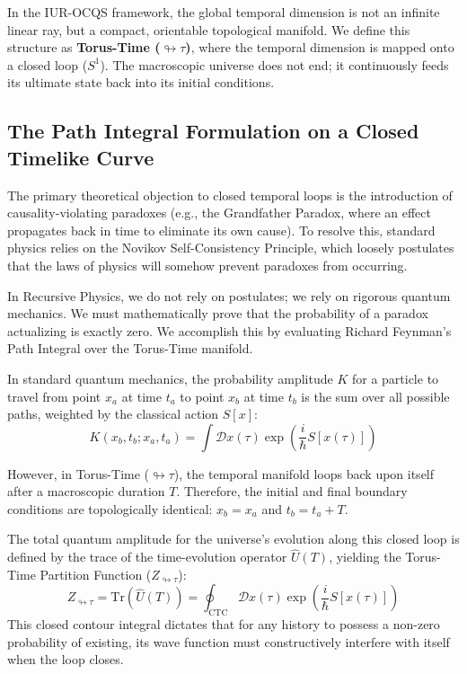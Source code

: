 \documentclass[12pt,openany]{book}
\begin{document}
In the IUR-OCQS framework, the global temporal dimension is not an infinite linear ray, but a compact, orientable topological manifold. We define this structure as \textbf{Torus-Time ($\looparrowright\tau$)}, where the temporal dimension is mapped onto a closed loop ($S^1$). The macroscopic universe does not end; it continuously feeds its ultimate state back into its initial conditions.

\subsection{The Path Integral Formulation on a Closed Timelike Curve}
The primary theoretical objection to closed temporal loops is the introduction of causality-violating paradoxes (e.g., the Grandfather Paradox, where an effect propagates back in time to eliminate its own cause). To resolve this, standard physics relies on the Novikov Self-Consistency Principle, which loosely postulates that the laws of physics will somehow prevent paradoxes from occurring. 

In Recursive Physics, we do not rely on postulates; we rely on rigorous quantum mechanics. We must mathematically prove that the probability of a paradox actualizing is exactly zero. We accomplish this by evaluating Richard Feynman’s Path Integral over the Torus-Time manifold.

In standard quantum mechanics, the probability amplitude $K$ for a particle to travel from point $x_a$ at time $t_a$ to point $x_b$ at time $t_b$ is the sum over all possible paths, weighted by the classical action $S[x]$:
\begin{equation}
    K(x_b, t_b; x_a, t_a) = \int \mathcal{D}x(\tau) \exp\left( \frac{i}{\hbar} S[x(\tau)] \right)
\end{equation}

However, in Torus-Time ($\looparrowright\tau$), the temporal manifold loops back upon itself after a macroscopic duration $T$. Therefore, the initial and final boundary conditions are topologically identical: $x_b = x_a$ and $t_b = t_a + T$. 

The total quantum amplitude for the universe's evolution along this closed loop is defined by the trace of the time-evolution operator $\hat{U}(T)$, yielding the Torus-Time Partition Function ($Z_{\looparrowright\tau}$):
\begin{equation}
    Z_{\looparrowright\tau} = \text{Tr}(\hat{U}(T)) = \oint_{\text{CTC}} \mathcal{D}x(\tau) \exp\left( \frac{i}{\hbar} S[x(\tau)] \right)
\end{equation}
This closed contour integral dictates that for any history to possess a non-zero probability of existing, its wave function must constructively interfere with itself when the loop closes.
\end{document}
